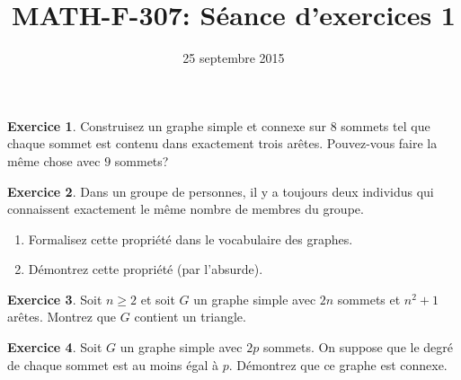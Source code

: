 \documentclass[11pt, a4paper]{article}
\begin{document}
 

\title{MATH-F-307: S\'eance d'exercices 1} 
\author{} 
\date{25 septembre 2015}

\theoremstyle{plain} 
\newtheorem*{theo}{Th\'eor\`eme}

\theoremstyle{definition} 
\newtheorem{exo}{Exercice}

\newcommand{\R}{\mathbb{R}} 
\newcommand{\Z}{\mathbb{Z}} 
\newcommand{\N}{\mathbb{N}} 

\renewcommand{\FrenchLabelItem}{\textbullet}

\maketitle


\begin{exo}
Construisez un graphe simple et connexe sur $8$ sommets tel que chaque sommet est contenu dans exactement trois ar\^etes. Pouvez-vous faire la m\^eme chose avec $9$ sommets?
\end{exo}

\begin{exo}
Dans un groupe de personnes, il y a toujours deux individus qui connaissent exactement le m\^eme nombre de membres du groupe.
\begin{enumerate}
\item Formalisez cette propri\'et\'e dans le vocabulaire des graphes.
\item D\'emontrez cette propri\'et\'e (par l'absurde).
\end{enumerate}
\end{exo}

\begin{exo}
Soit $n\geq 2$ et soit $G$ un graphe simple avec $2n$ sommets et $n^2+1$ ar\^etes. Montrez que $G$ contient un triangle.
\end{exo}

\begin{exo}
Soit $G$ un graphe simple avec $2p$ sommets. On suppose que le degr\'e de chaque sommet est au moins \'egal \`a $p$. D\'emontrez que ce graphe est connexe.
\end{exo}
\end{document}
